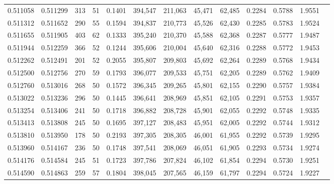 \begin{tabular}{rrrrrrrrrrrrr}
0.511058 & 0.511299 &    313 &    51 &                                     0.1401 & 394,547 & 211,063 &  45,471 &  62,485 & 0.2284 & 0.5788 & 1.9551 \\
0.511312 & 0.511652 &    290 &    55 &                                     0.1594 & 394,837 & 210,773 &  45,526 &  62,430 & 0.2285 & 0.5783 & 1.9524 \\
0.511655 & 0.511905 &    403 &    62 &                                     0.1333 & 395,240 & 210,370 &  45,588 &  62,368 & 0.2287 & 0.5777 & 1.9487 \\
0.511944 & 0.512259 &    366 &    52 &                                     0.1244 & 395,606 & 210,004 &  45,640 &  62,316 & 0.2288 & 0.5772 & 1.9453 \\
0.512262 & 0.512491 &    201 &    52 &                                     0.2055 & 395,807 & 209,803 &  45,692 &  62,264 & 0.2289 & 0.5768 & 1.9434 \\
0.512500 & 0.512756 &    270 &    59 &                                     0.1793 & 396,077 & 209,533 &  45,751 &  62,205 & 0.2289 & 0.5762 & 1.9409 \\
0.512760 & 0.513016 &    268 &    50 &                                     0.1572 & 396,345 & 209,265 &  45,801 &  62,155 & 0.2290 & 0.5757 & 1.9384 \\
0.513022 & 0.513236 &    296 &    50 &                                     0.1445 & 396,641 & 208,969 &  45,851 &  62,105 & 0.2291 & 0.5753 & 1.9357 \\
0.513254 & 0.513406 &    241 &    50 &                                     0.1718 & 396,882 & 208,728 &  45,901 &  62,055 & 0.2292 & 0.5748 & 1.9335 \\
0.513413 & 0.513808 &    245 &    50 &                                     0.1695 & 397,127 & 208,483 &  45,951 &  62,005 & 0.2292 & 0.5744 & 1.9312 \\
0.513810 & 0.513950 &    178 &    50 &                                     0.2193 & 397,305 & 208,305 &  46,001 &  61,955 & 0.2292 & 0.5739 & 1.9295 \\
0.513960 & 0.514167 &    236 &    50 &                                     0.1748 & 397,541 & 208,069 &  46,051 &  61,905 & 0.2293 & 0.5734 & 1.9274 \\
0.514176 & 0.514584 &    245 &    51 &                                     0.1723 & 397,786 & 207,824 &  46,102 &  61,854 & 0.2294 & 0.5730 & 1.9251 \\
0.514590 & 0.514863 &    259 &    57 &                                     0.1804 & 398,045 & 207,565 &  46,159 &  61,797 & 0.2294 & 0.5724 & 1.9227 \\

\end{tabular}
